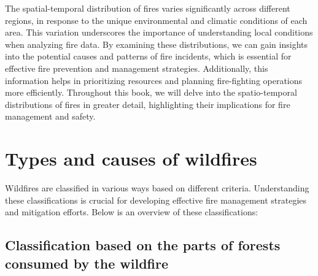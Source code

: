 \documentclass[
  12 pt,
]{Nemilov}
\begin{document}
The spatial-temporal distribution of fires varies significantly across different regions, in response to the unique environmental and climatic conditions of each area. This variation underscores the importance of understanding local conditions when analyzing fire data. By examining these distributions, we can gain insights into the potential causes and patterns of fire incidents, which is essential for effective fire prevention and management strategies. Additionally, this information helps in prioritizing resources and planning fire-fighting operations more efficiently. Throughout this book, we will delve into the spatio-temporal distributions of fires in greater detail, highlighting their implications for fire management and safety.

\section{Types and causes of wildfires}\label{types-and-causes-of-wildfires}

Wildfires are classified in various ways based on different criteria. Understanding these classifications is crucial for developing effective fire management strategies and mitigation efforts. Below is an overview of these classifications:

\subsection{Classification based on the parts of forests consumed by the wildfire}\label{classification-based-on-the-parts-of-forests-consumed-by-the-wildfire}
\end{document}
